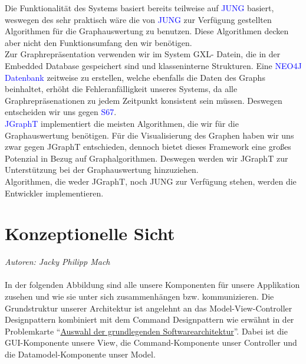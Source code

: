 \documentclass[enabledeprecatedfontcommands,fontsize=11pt,paper=a4,twoside]{scrartcl}
\newcounter{one}
\newcommand{\cb}[1]{{\textcolor{blue}{#1}}}
\begin{document}
\begin{onehalfspace}
	Die Funktionalität des Systems basiert bereits teilweise auf \cb{JUNG} basiert, weswegen des sehr praktisch wäre die von \cb{JUNG} zur Verfügung gestellten Algorithmen für die Graphauswertung zu benutzen. Diese Algorithmen decken aber nicht den Funktionsumfang den wir benötigen.\\
	Zur Graphrepräsentation verwenden wir im System GXL- Datein, die in der Embedded Database gespeichert sind und klasseninterne Strukturen. Eine \cb{NEO4J Datenbank} zeitweise zu erstellen, welche ebenfalls die Daten des Graphs beinhaltet, erhöht die Fehleranfälligkeit unseres Systems, da alle Graphrepräsenationen zu jedem Zeitpunkt konsistent sein müssen. Deswegen entscheiden wir uns gegen \cb{S67}. \\
	\cb{JGraphT} implementiert die meisten Algorithmen, die wir für die Graphauswertung benötigen. Für die Visualisierung des Graphen haben wir uns zwar gegen JGraphT entschieden, dennoch bietet dieses Framework eine großes Potenzial in Bezug auf Graphalgorithmen. Deswegen werden wir JGraphT zur Unterstützung bei der Graphauswertung hinzuziehen. \\
	Algorithmen, die weder JGraphT, noch JUNG zur Verfügung stehen, werden die Entwickler implementieren.
\end{onehalfspace}


\newpage

\section{Konzeptionelle Sicht}
\label{sec:konzeptionell}
\emph{Autoren: Jacky Philipp Mach}\\ \\

In der folgenden Abbildung sind alle unsere Komponenten für unsere Applikation zusehen und wie sie unter sich zusammenhängen bzw. kommunizieren.
Die Grundstruktur unserer Architektur ist angelehnt an das Model-View-Controller Designpattern kombiniert mit dem Command Designpattern wie erwähnt in der Problemkarte “\hyperlink{bbb}{Auswahl der grundlegenden Softwarearchitektur}”.
Dabei ist die GUI-Komponente unsere View, die Command-Komponente unser Controller und die Datamodel-Komponente unser Model. \\ \\
\end{document}
